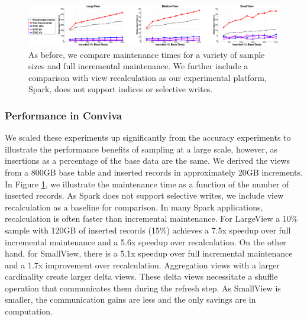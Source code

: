 \begin{figure}[ht] %
\hspace{-1em}
\vspace{-0.75em}
\includegraphics[scale=0.21]{exp/exp5-efficiency-conviva.eps}
 \caption{As before, we compare maintenance times for a variety of sample sizes and full incremental maintenance. We further include a comparison with view recalculation as our experimental platform, Spark, does not support indices or selective writes.\label{exp6conviva}} \vspace{-1em}
\end{figure}

\subsubsection{Performance in Conviva}
We scaled these experiments up significantly from the accuracy experiments to illustrate the performance benefits of sampling at a large scale, however, as insertions as a percentage of the base data are the same.
We derived the views from a 800GB base table and inserted records in approximately 20GB increments. 
In Figure \ref{exp6conviva}, we illustrate the maintenance time as a function of the number of inserted records.
As Spark does not support selective writes, we include view recalculation as a baseline for comparison.
In many Spark applications, recalculation is often faster than incremental maintenance.
For LargeView a 10\% sample with 120GB of inserted records (15\%) achieves a  7.5x speedup over full incremental maintenance and a 5.6x speedup over recalculation.
On the other hand, for SmallView, there is a 5.1x speedup over full incremental maintenance and a 1.7x improvement over recalculation.
Aggregation views with a larger cardinality create larger delta views.
These delta views necessitate a shuffle operation that communicates them during the refresh step.
As SmallView is smaller, the communication gains are less and the only savings are in computation.



